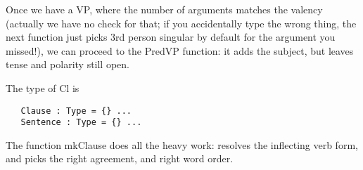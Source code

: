 \documentclass[11pt,a4paper]{article}
\begin{document}
Once we have a VP, where the number of arguments matches the valency (actually we have no check for that; if you accidentally type the wrong thing, the next function just picks 3rd person singular by default for the argument you missed!),
we can proceed to the PredVP function: it adds the subject, but leaves tense and polarity still open.

The type of Cl is 

   \begin{verbatim}
   Clause : Type = {} ...
   Sentence : Type = {} ...
   \end{verbatim}

The function mkClause does all the heavy work: resolves the inflecting verb form, and picks the right agreement, and right word order.
\end{document}
